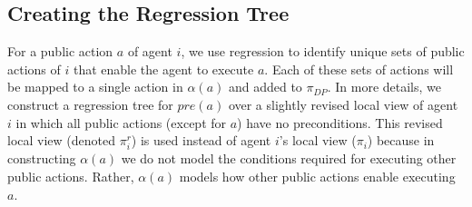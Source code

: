 \documentclass[letterpaper]{article}
\newcommand{\pre}{\textit{pre}}
\theoremstyle{definition}
\begin{document}







\subsection{Creating the Regression Tree}


For a public action $a$ of agent $i$, we use regression to identify unique sets of public actions of $i$ that enable the agent to execute $a$. Each of these sets of actions will be mapped to a single action in $\alpha(a)$ and added to $\pi_{DP}$.
In more details, we construct a regression tree for $\pre(a)$ over a slightly revised local view of agent $i$ in which all public actions (except for $a$) have no preconditions. This revised local view (denoted $\pi_i^r$) is used instead of agent $i$'s local view ($\pi_i$) because in constructing $\alpha(a)$ we do not model the conditions required for executing other public actions. Rather, $\alpha(a)$ models how other public actions enable executing $a$.
\end{document}
